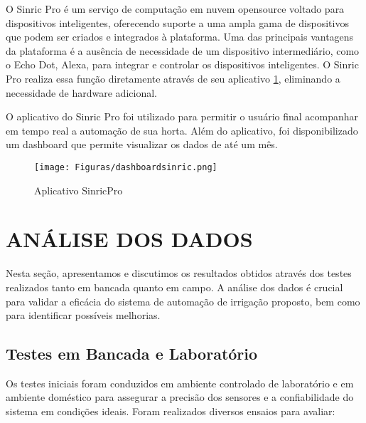 \documentclass[%
  article,%
  a4paper,%
  12pt,%
  fleqn,%
  oneside,%
  chapter = TITLE,%
  section = TITLE,%
]{abntex2}
\begin{document}

O Sinric Pro é um serviço de computação em nuvem opensource voltado para dispositivos inteligentes, oferecendo suporte a uma ampla gama de dispositivos que podem ser criados e integrados à plataforma. Uma das principais vantagens da plataforma é a ausência de necessidade de um dispositivo intermediário, como o Echo Dot, Alexa, para integrar e controlar os dispositivos inteligentes. O Sinric Pro realiza essa função diretamente através de seu aplicativo \cref{fig:sinricPro}, eliminando a necessidade de hardware adicional.

O aplicativo do Sinric Pro foi utilizado para permitir o usuário final acompanhar em tempo real a automação de sua horta. Além do aplicativo, foi disponibilizado um dashboard que permite visualizar os dados de até um mês.

\begin{figure}[!h]
    \centering
    \caption{Aplicativo SinricPro}
    \texttt{[image: Figuras/dashboardsinric.png]}
    \label{fig:sinricPro}
\end{figure}


\section{ANÁLISE DOS DADOS}
Nesta seção, apresentamos e discutimos os resultados obtidos através dos testes realizados tanto em bancada quanto em campo. A análise dos dados é crucial para validar a eficácia do sistema de automação de irrigação proposto, bem como para identificar possíveis melhorias.

\subsection{Testes em Bancada e Laboratório}

Os testes iniciais foram conduzidos em ambiente controlado de laboratório e em ambiente doméstico para assegurar a precisão dos sensores e a confiabilidade do sistema em condições ideais. Foram realizados diversos ensaios para avaliar:
\end{document}
